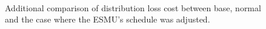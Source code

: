 \begin{figure}\centering
{}\\	
\caption{Additional comparison of distribution loss cost between base, normal and the case where the ESMU's schedule was adjusted.}
\end{figure}